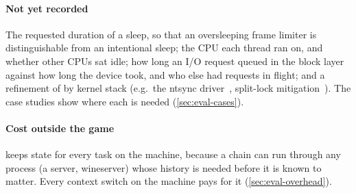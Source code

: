 \paragraph{Not yet recorded} The requested duration of a sleep, so that an
oversleeping frame limiter is distinguishable from an intentional sleep; the
CPU each thread ran on, and whether other CPUs sat idle; how long an I/O
request queued in the block layer against how long the device took, and who
else had requests in flight; and a refinement of  by
kernel stack (e.g.\ the ntsync driver~\cite{ntsync}, split-lock
mitigation~\cite{lwn-splitlock}). The case studies show where each is needed
(\autoref{sec:eval-cases}). 

\paragraph{Cost outside the game} \sys keeps state for every task on the
machine, because a chain can run through any process (a server, wineserver)
whose history is needed before it is known to matter. Every context switch
on the machine pays for it (\autoref{sec:eval-overhead}).
